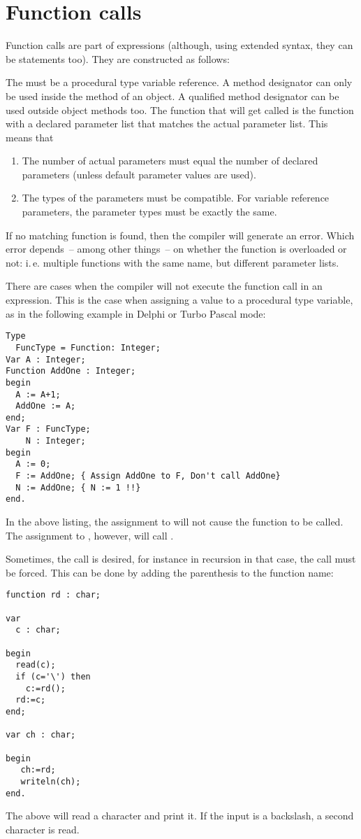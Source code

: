 \section{Function calls}
Function calls are part of expressions (although, using extended syntax,
they can be statements too). They are constructed as follows:

The  must be a procedural type variable reference.
A method designator can only be used inside the method of an object. A
qualified method designator can be used outside object methods too.
The function that will get called is the function with a declared parameter
list that matches the actual parameter list. This means that
\begin{enumerate}
\item The number of actual parameters must equal the number of declared
parameters (unless default parameter values are used).
\item The types of the parameters must be compatible. For variable
reference parameters, the parameter types must be exactly the same.
\end{enumerate}
If no matching function is found, then the compiler will generate an error.
Which error depends~-- among other things~-- on whether the function is overloaded
or not: i.\,e. multiple functions with the same name, but different parameter
lists.

There are cases when the compiler will not execute the function call in an
expression. This is the case when assigning a value to a procedural
type variable, as in the following example in Delphi or Turbo Pascal mode:
\begin{verbatim}
Type
  FuncType = Function: Integer;
Var A : Integer;
Function AddOne : Integer;
begin
  A := A+1;
  AddOne := A;
end;
Var F : FuncType;
    N : Integer;
begin
  A := 0;
  F := AddOne; { Assign AddOne to F, Don't call AddOne}
  N := AddOne; { N := 1 !!}
end.
\end{verbatim}
In the above listing, the assignment to  will not cause the function
 to be called. The assignment to , however, will call
.

Sometimes, the call is desired, for instance in recursion
in that case, the call must be forced. This can be done by adding the
parenthesis to the function name:
\begin{verbatim}
function rd : char;

var
  c : char;

begin
  read(c);
  if (c='\') then
    c:=rd();
  rd:=c;
end;

var ch : char;

begin
   ch:=rd;
   writeln(ch);
end.
\end{verbatim}
The above will read a character and print it. If the input is a backslash, a
second character is read.

